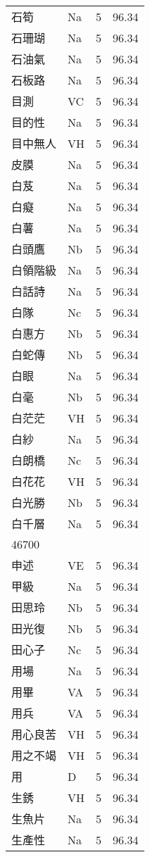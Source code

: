 \documentclass[twocolumn]{book}
\begin{document}
\begin{supertabular}{llrr}
石筍 & Na & 5 &  96.34\\
石珊瑚 & Na & 5 &  96.34\\
石油氣 & Na & 5 &  96.34\\
石板路 & Na & 5 &  96.34\\
目測 & VC & 5 &  96.34\\
目的性 & Na & 5 &  96.34\\
目中無人 & VH & 5 &  96.34\\
皮膜 & Na & 5 &  96.34\\
白芨 & Na & 5 &  96.34\\
白癡 & Na & 5 &  96.34\\
白薯 & Na & 5 &  96.34\\
白頭鷹 & Nb & 5 &  96.34\\
白領階級 & Na & 5 &  96.34\\
白話詩 & Na & 5 &  96.34\\
白隊 & Nc & 5 &  96.34\\
白惠方 & Nb & 5 &  96.34\\
白蛇傳 & Nb & 5 &  96.34\\
白眼 & Na & 5 &  96.34\\
白毫 & Nb & 5 &  96.34\\
白茫茫 & VH & 5 &  96.34\\
白紗 & Na & 5 &  96.34\\
白朗橋 & Nc & 5 &  96.34\\
白花花 & VH & 5 &  96.34\\
白光勝 & Nb & 5 &  96.34\\
白千層 & Na & 5 &  96.34\\
46700\\
申述 & VE & 5 &  96.34\\
甲級 & Na & 5 &  96.34\\
田思玲 & Nb & 5 &  96.34\\
田光復 & Nb & 5 &  96.34\\
田心子 & Nc & 5 &  96.34\\
用場 & Na & 5 &  96.34\\
用畢 & VA & 5 &  96.34\\
用兵 & VA & 5 &  96.34\\
用心良苦 & VH & 5 &  96.34\\
用之不竭 & VH & 5 &  96.34\\
用 & D & 5 &  96.34\\
生銹 & VH & 5 &  96.34\\
生魚片 & Na & 5 &  96.34\\
生產性 & Na & 5 &  96.34\\

\end{supertabular}
\end{document}
